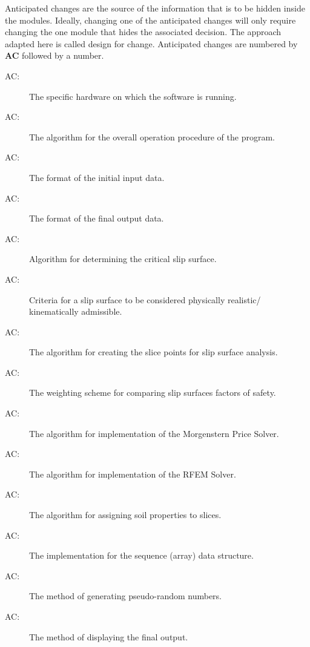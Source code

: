 \documentclass[12pt]{article}
\newcounter{acnum}
\begin{document}
\hspace{3ex}Anticipated changes are the source of the information that
is to be hidden inside the modules. Ideally, changing one of the
anticipated changes will only require changing the one module that
hides the associated decision. The approach adapted here is called
design for change. Anticipated changes are numbered by \textbf{AC}
followed by a number.

\begin{description}
\item[AC\theacnum \label{AC_hardware}:] The
  specific hardware on which the software is running.
\item[AC\theacnum \label{AC_Control}:] The
  algorithm for the overall operation procedure of the program.
\item[AC\theacnum \label{AC_input}:] The format
  of the initial input data.
\item[AC\theacnum \label{AC_output}:] The format
  of the final output data.
\item[AC\theacnum \label{AC_GenAlg}:] Algorithm
  for determining the critical slip surface.
\item[AC\theacnum \label{AC_Kin}:] Criteria for
  a slip surface to be considered physically realistic/ kinematically
  admissible.
\item[AC\theacnum \label{AC_Slicer}:] The
  algorithm for creating the slice points for slip surface analysis.
\item[AC\theacnum \label{AC_FSweight}:] The
  weighting scheme for comparing slip surfaces factors of safety.
\item[AC\theacnum \label{AC_MP}:] The
  algorithm for implementation of the Morgenstern Price Solver.
\item[AC\theacnum \label{AC_RFEM}:] The
  algorithm for implementation of the RFEM Solver.
\item[AC\theacnum \label{AC_PropSorter}:] The
  algorithm for assigning soil properties to slices.
\item[AC\theacnum \label{AC_Array}:] The
  implementation for the sequence (array) data structure.
\item[AC\theacnum \label{AC_Rand}:] The method
  of generating pseudo-random numbers.
\item[AC\theacnum \label{AC_Plot}:] The method
  of displaying the final output.
\end{description}
\end{document}
